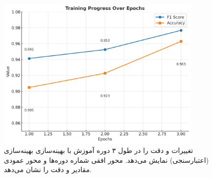\begin{figure}[h!]
\centering
\includegraphics[width=0.9\textwidth]{images/fig_training_progress_en}
\caption{تغییرات  و دقت را در طول ۳ دوره آموزش با بهینه‌سازی بهینه‌سازی (اعتبارسنجی) نمایش می‌دهد. محور افقی شماره دوره‌ها و محور عمودی مقادیر  و دقت را نشان می‌دهد.}
\label{fig:training_progress}
\end{figure}

     
     
     
     
     
     
     
     
     
     
     
     